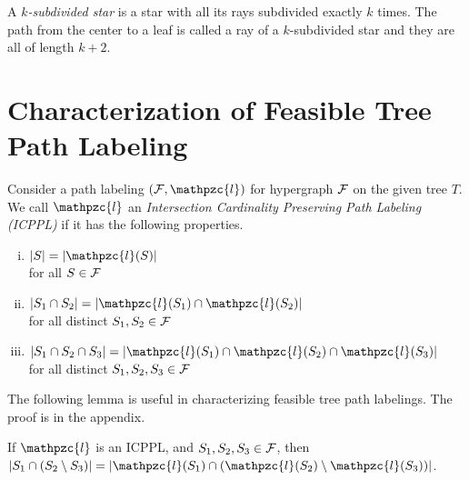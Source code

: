 \documentclass[11pt,letter]{../lib/llncs}
\def\cF{{\cal F}}
\def\cP{{\cal P}}
\def\cl{\mathpzc{l}}
\def\icppl{\maltese}
\def\xnoindent{\noindent} %
\def\topshrink{0mm} %
\begin{document}
\xnoindent A {\em $k$-subdivided star} is a star with all its rays
subdivided exactly $k$ times. The path from the center to a leaf is
called a ray of a $k$-subdivided star and they are all of length
$k+2$.


\section{Characterization of Feasible Tree Path  Labeling} 
\label{sec:feasible} 

Consider a path labeling $(\cF, \cl)$ for hypergraph $\cF$ on the
given tree $T$. We call $\cl$ an {\em Intersection Cardinality
  Preserving Path Labeling (ICPPL)} if it has the following
properties.

\vspace{\topshrink}
{\em
  \begin{enumerate}[i.]
  \item $|S| = |\cl(S)|$\\%
    for all $S \in \cF$%
\vspace{\topshrink}
  \item $|S_1 \cap S_2| = |\cl(S_1) \cap
    \cl(S_2)|$\\%
    for all distinct $S_1, S_2 \in
    \cF$%
\vspace{\topshrink}
  \item $|S_1 \cap S_2 \cap S_3| = |\cl(S_1)
    \cap \cl(S_2) \cap
    \cl(S_3)|$\\%
    for all distinct $S_1, S_2, S_3 \in
    \cF$%
  \end{enumerate}}

\xnoindent The following lemma is useful in characterizing feasible
tree path labelings.  The proof is in the appendix.
\begin{lemma}
  \label{lem:setminuscard}
  If $\cl$ is an ICPPL, and $S_1, S_2, S_3 \in \cF$, then $|S_1 \cap
  (S_2 \setminus S_3)| = |\cl(S_1) \cap (\cl(S_2) \setminus
  \cl(S_3))|$.
\end{lemma}
\end{document}
